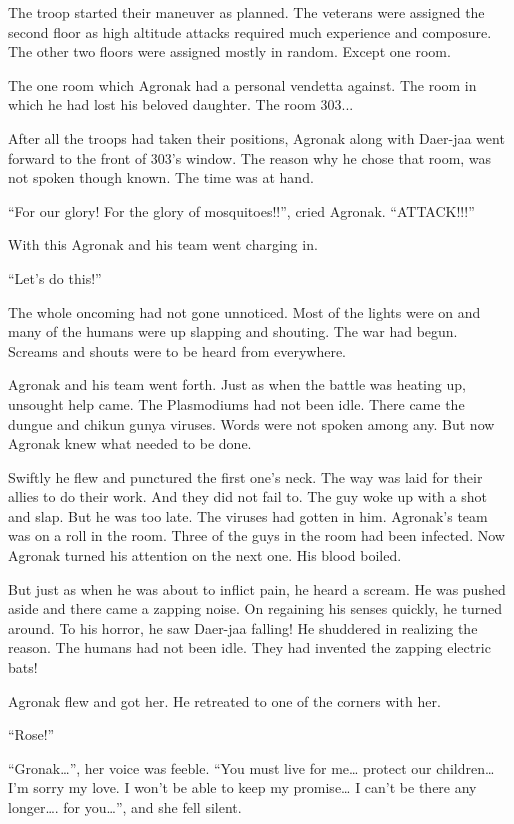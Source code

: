 \documentclass[twoside,11pt]{article}
\begin{document}
The troop started their maneuver as planned. The veterans were assigned the second floor as high altitude attacks required much experience and composure. The other two floors were assigned mostly in random. Except one room.

The one room which Agronak had a personal vendetta against. The room in which he had lost his beloved daughter. The room 303...

After all the troops had taken their positions, Agronak along with Daer-jaa went forward to the front of 303's window. The reason why he chose that room, was not spoken though known. The time was at hand.

``For our glory! For the glory of mosquitoes!!'', cried Agronak. ``ATTACK!!!''

With this Agronak and his team went charging in.

``Let’s do this!''

The whole oncoming had not gone unnoticed. Most of the lights were on and many of the humans were up slapping and shouting. The war had begun. Screams and shouts were to be heard from everywhere.

Agronak and his team went forth. Just as when the battle was heating up, unsought help came. The Plasmodiums had not been idle. There came the dungue and chikun gunya viruses. Words were not spoken among any. But now Agronak knew what needed to be done.

Swiftly he flew and punctured the first one's neck. The way was laid for their allies to do their work. And they did not fail to. The guy woke up with a shot and slap. But he was too late. The viruses had gotten in him. Agronak's team was on a roll in the room. Three of the guys in the room had been infected. Now Agronak turned his attention on the next one. His blood boiled.

But just as when he was about to inflict pain, he heard a scream. He was pushed aside and there came a zapping noise. On regaining his senses quickly, he turned around. To his horror, he saw Daer-jaa falling! He shuddered in realizing the reason. The humans had not been idle. They had invented the zapping electric bats!

Agronak flew and got her. He retreated to one of the corners with her.

``Rose!''

``Gronak…'', her voice was feeble. ``You must live for me… protect our children… I'm sorry my love. I won't be able to keep my promise… I can't be there any longer…. for you…'', and she fell silent.
\end{document}
